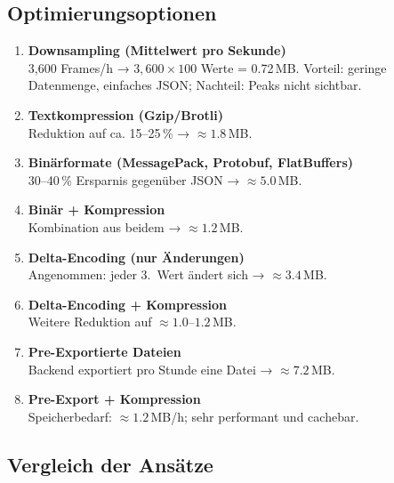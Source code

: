 \subsection{Optimierungsoptionen}
\begin{enumerate}
    \item \textbf{Downsampling (Mittelwert pro Sekunde)} \\
    3{,}600 Frames/h → $3{,}600 \times 100$ Werte = 0.72\,MB.  
    Vorteil: geringe Datenmenge, einfaches JSON; Nachteil: Peaks nicht sichtbar.
    \item \textbf{Textkompression (Gzip/Brotli)} \\
    Reduktion auf ca. 15–25\,\% → $\approx 1.8$\,MB.
    \item \textbf{Binärformate (MessagePack, Protobuf, FlatBuffers)} \\
    30–40\,\% Ersparnis gegenüber JSON → $\approx 5.0$\,MB.
    \item \textbf{Binär + Kompression} \\
    Kombination aus beidem → $\approx 1.2$\,MB.
    \item \textbf{Delta-Encoding (nur Änderungen)} \\
    Angenommen: jeder 3.~Wert ändert sich → $\approx 3.4$\,MB.
    \item \textbf{Delta-Encoding + Kompression} \\
    Weitere Reduktion auf $\approx 1.0$–$1.2$\,MB.
    \item \textbf{Pre-Exportierte Dateien} \\
    Backend exportiert pro Stunde eine Datei → $\approx 7.2$\,MB.
    \item \textbf{Pre-Export + Kompression} \\
    Speicherbedarf: $\approx 1.2$\,MB/h; sehr performant und cachebar.
\end{enumerate}

\subsection{Vergleich der Ansätze}

